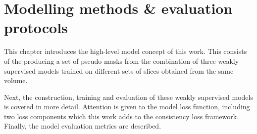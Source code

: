 \chapter{Modelling methods \& evaluation protocols}
\par{
    This chapter introduces the high-level model concept of this work.
    This consists of the producing a set of pseudo masks from the combination of three weakly supervised models trained on different sets of slices obtained from the same volume.
}
\par{
    Next, the construction, training and evaluation of these weakly supervised models is covered in more detail.
    Attention is given to the model loss function, including two loss components which this work adds to the consistency loss framework.
    Finally, the model evaluation metrics are described.
}




\FloatBarrier



